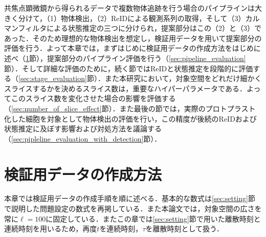 \thispagestyle{fancy2}

共焦点顕微鏡から得られるデータで複数物体追跡を行う場合のパイプラインは大きく分けて，（1）物体検出，（2）ReIDによる観測系列の取得，そして（3）カルマンフィルタによる状態推定の三つに分けられ，提案部分はこの（2）と（3）であった．そのため理想的な物体検出を想定し，検証用データを用いて提案部分の評価を行う．よって本章では，まずはじめに検証用データの作成方法をはじめに述べ（\ref{sec:demodata}節），提案部分のパイプライン評価を行う（\ref{sec:pipeline_evaluation}節）．そして詳細な評価のために，続く節ではReIDと状態推定を段階的に評価する（\ref{sec:stage_evaluation}節）．また本研究において，対象空間をどれだけ細かくスライスするかを決めるスライス数は，重要なハイパーパラメータである．よってこのスライス数を変化させた場合の影響を評価する（\ref{sec:number_of_slice_effect}節）．また最後の節では，実際のプロトプラスト化した細胞を対象として物体検出の評価を行い，この精度が後続のReIDおよび状態推定に及ぼす影響および対処方法を議論する（\ref{sec:pipleline_evaluation_with_detection}節）．

\section{検証用データの作成方法}
\label{sec:demodata}

本章では検証用データの作成手順を順に述べる．基本的な数式は\ref{sec:setting}節で説明した問題設定の数式を再掲している．また本論文では，対象空間の広さを常に$\ell = 100$に固定している．またこの章では\ref{sec:setting}節で用いた離散時刻と連続時刻を用いるため，再度$t$を連続時刻，$\tau$を離散時刻として扱う．

